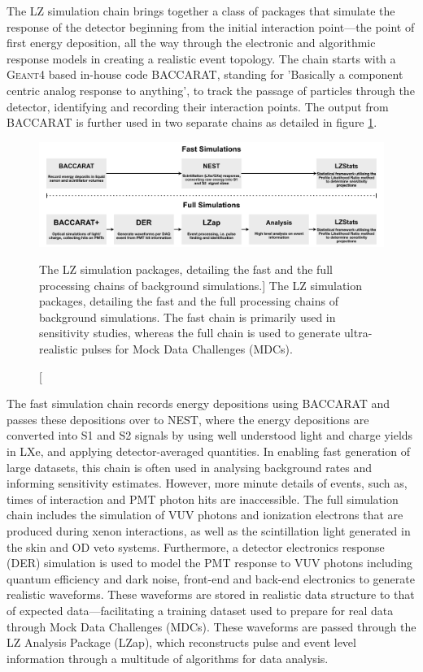 The LZ simulation chain brings together a class of packages that simulate the response of the detector beginning from the initial interaction point---the point of first energy deposition, all the way through the electronic and algorithmic response models in creating a realistic event topology. The chain starts with a \textsc{Geant4} based in-house code \textsc{BACCARAT}, standing for 'Basically a component centric analog response to anything', to track the passage of particles through the detector, identifying and recording their interaction points. The output from \textsc{BACCARAT} is further used in two separate chains as detailed in figure \ref{fig:lz_simulation_chains}. 

%
\begin{figure}[b]
    \centering
    \hspace*{-0.2cm}
    \includegraphics[scale=0.7]{Chapter_5/Figures/LZ_simulations_chains.jpg}
    \caption
    [The LZ simulation packages, detailing the fast and the full processing chains of background simulations.]
    {The LZ simulation packages, detailing the fast and the full processing chains of background simulations. The fast chain is primarily used in sensitivity studies, whereas the full chain is used to generate ultra-realistic pulses for Mock Data Challenges (MDCs).}
    \label{fig:lz_simulation_chains}
\end{figure}
%

The fast simulation chain records energy depositions using \textsc{BACCARAT} and passes these depositions over to \textsc{NEST}, where the energy depositions are converted into S1 and S2 signals by using well understood light and charge yields in LXe, and applying detector-averaged quantities. In enabling fast generation of large datasets, this chain is often used in analysing background rates and informing sensitivity estimates. However, more minute details of events, such as, times of interaction and PMT photon hits are inaccessible. The full simulation chain includes the simulation of VUV photons and ionization electrons that are produced during xenon interactions, as well as the scintillation light generated in the skin and OD veto systems. Furthermore, a detector electronics response (DER) simulation is used to model the PMT response to VUV photons including quantum efficiency and dark noise, front-end and back-end electronics to generate realistic waveforms. These waveforms are stored in realistic data structure to that of expected data---facilitating a training dataset used to prepare for real data through Mock Data Challenges (MDCs). These waveforms are passed through the LZ Analysis Package (LZap), which reconstructs pulse and event level information through a multitude of algorithms for data analysis.

